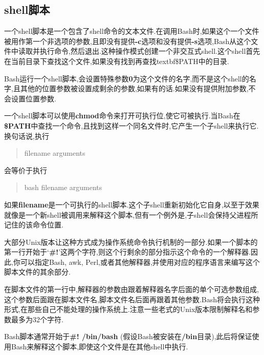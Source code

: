 \documentclass[draft,openany]{book}
\begin{document}
\begin{CJK}{UTF8}{gbsn}
    \subsection{shell脚本}
    一个shell脚本是一个包含了shell命令的文本文件.在调用Bash时,如果这个一个文件被用作第一个非选项的参数,且即没有提供\textbf{-c}选项和没有提供\textbf{-s}选项,Bash从这个文件中读取并执行命令,然后退出.这种操作模式创建一个非交互式shell.这个shell首先在当前目录下查找这个文件,如果没有找到再查找textbf{\$PATH}中的目录.\par
    Bash运行一个shell脚本,会设置特殊参数\textbf{0}为这个文件的名字,而不是这个shell的名字,且其他的位置参数被设置成剩余的参数,如果有的话.如果没有提供附加参数,不会设置位置参数.\par
    一个shell脚本可以使用\textbf{chmod}命令来打开可执行位,使它可被执行.当Bash在\textbf{\$PATH}中查找一个命令,且找到这样一个同名文件时,它产生一个子shell来执行它.换句话说,执行
    \begin{quote}
        filename arguments
    \end{quote}
    会等价于执行
    \begin{quote}
        bash filename arguments
    \end{quote}
    如果\textbf{filename}是一个可执行的shell脚本.这个子shell重新初始化它自身,以至于效果就像是一个新shell被调用来解释这个脚本,但有一个例外是,子shell会保持父进程所记住的该命令位置.\par
    大部分Unix版本让这种方式成为操作系统命令执行机制的一部分.如果一个脚本的第一行开始于`\textbf{\#!}'这两个字符,则这个行剩余的部分指示这个命令的一个解释器.因此,你可以指定Bash, awk, Perl,或者其他解释器,并使用对应的程序语言来编写这个脚本文件的其余部分.\par
    在脚本文件的第一行中,解释器的参数由跟着解释器名字后面的单个可选参数组成,这个参数后面跟在脚本文件名,脚本文件名后面再跟着其他参数.Bash将会执行这种形式,在那些自己不能处理的操作系统上.注意一些老式的Unix版本限制解释名和参数最多为32个字符.\par
    Bash脚本通常开始于\textbf{\#! /bin/bash} (假设Bash被安装在\textbf{/bin}目录),此后将保证使用Bash来解释这个脚本,即使这个文件是在其他shell中执行.


\end{CJK}
\end{document}
